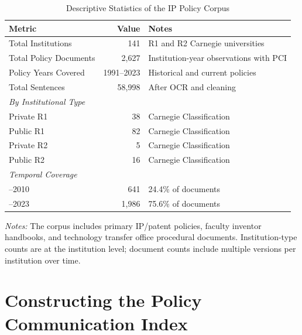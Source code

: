 \documentclass[12pt]{article}
\begin{document}
\begin{table}[H]
\centering
\caption{Descriptive Statistics of the IP Policy Corpus}
\label{tab:corpus}
\begin{threeparttable}
\small
\begin{tabular}{lrl}
\toprule
\textbf{Metric} & \textbf{Value} & \textbf{Notes} \\
\midrule
Total Institutions          & 141         & R1 and R2 Carnegie universities \\
Total Policy Documents      & 2,627       & Institution-year observations with PCI \\
Policy Years Covered        & 1991--2023  & Historical and current policies \\
Total Sentences             & 58,998      & After OCR and cleaning \\
\addlinespace
\textit{By Institutional Type} & & \\
\quad Private R1            & 38          & Carnegie Classification \\
\quad Public R1             & 82          & Carnegie Classification \\
\quad Private R2            & 5           & Carnegie Classification \\
\quad Public R2             & 16          & Carnegie Classification \\
\addlinespace
\textit{Temporal Coverage} & & \\
\quad 1991--2010            & 641         & 24.4\% of documents \\
\quad 2011--2023            & 1,986       & 75.6\% of documents \\
\bottomrule
\end{tabular}
\begin{tablenotes}
\small
\item \textit{Notes:} The corpus includes primary IP/patent policies, faculty inventor
  handbooks, and technology transfer office procedural documents.  Institution-type
  counts are at the institution level; document counts include multiple versions per
  institution over time.
\end{tablenotes}
\end{threeparttable}
\end{table}

\section{Constructing the Policy Communication Index}
\end{document}
